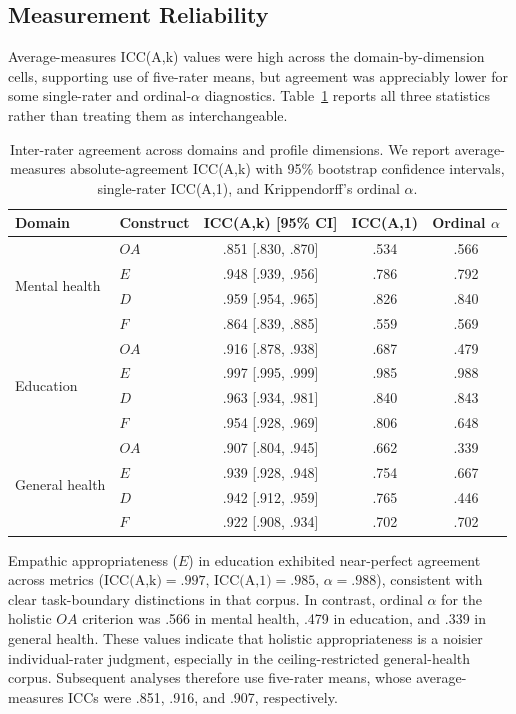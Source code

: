 \documentclass[manuscript,review,anonymous]{acmart}
\begin{document}
\subsection{Measurement Reliability}

Average-measures ICC(A,k) values were high across the domain-by-dimension cells, supporting use of five-rater means, but agreement was appreciably lower for some single-rater and ordinal-$\alpha$ diagnostics. Table~\ref{tab:reliability} reports all three statistics rather than treating them as interchangeable.


\begin{table}[t]
\centering
\small
\caption{Inter-rater agreement across domains and profile dimensions. We report average-measures absolute-agreement ICC(A,k) with 95\% bootstrap confidence intervals, single-rater ICC(A,1), and Krippendorff's ordinal $\alpha$.}
\label{tab:reliability}
\begin{tabular}{llccc}
\toprule
Domain & Construct & ICC(A,k) [95\% CI] & ICC(A,1) & Ordinal $\alpha$ \\
\midrule
\multirow{4}{*}{Mental health}
 & $OA$ & .851 [.830, .870] & .534 & .566 \\
 & $E$  & .948 [.939, .956] & .786 & .792 \\
 & $D$  & .959 [.954, .965] & .826 & .840 \\
 & $F$  & .864 [.839, .885] & .559 & .569 \\
\midrule
\multirow{4}{*}{Education}
 & $OA$ & .916 [.878, .938] & .687 & .479 \\
 & $E$  & .997 [.995, .999] & .985 & .988 \\
 & $D$  & .963 [.934, .981] & .840 & .843 \\
 & $F$  & .954 [.928, .969] & .806 & .648 \\
\midrule
\multirow{4}{*}{General health}
 & $OA$ & .907 [.804, .945] & .662 & .339 \\
 & $E$  & .939 [.928, .948] & .754 & .667 \\
 & $D$  & .942 [.912, .959] & .765 & .446 \\
 & $F$  & .922 [.908, .934] & .702 & .702 \\
\bottomrule
\end{tabular}
\end{table}
Empathic appropriateness ($E$) in education exhibited near-perfect agreement across metrics ($\text{ICC(A,k)}=.997$, $\text{ICC(A,1)}=.985$, $\alpha=.988$), consistent with clear task-boundary distinctions in that corpus. In contrast, ordinal $\alpha$ for the holistic $OA$ criterion was .566 in mental health, .479 in education, and .339 in general health. These values indicate that holistic appropriateness is a noisier individual-rater judgment, especially in the ceiling-restricted general-health corpus. Subsequent analyses therefore use five-rater means, whose average-measures ICCs were .851, .916, and .907, respectively.
\end{document}

